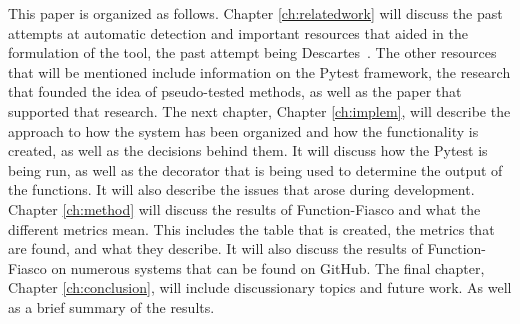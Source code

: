  This paper is organized as follows. Chapter \ref{ch:relatedwork} will discuss the past attempts at automatic detection and important resources that aided in the formulation of the tool, the past attempt being Descartes~\cite{vera2018descartes}. The other resources that will be mentioned include information on the Pytest framework, the research that founded the idea of pseudo-tested methods, as well as the paper that supported that research. The next chapter, Chapter \ref{ch:implem}, will describe the approach to how the system has been organized and how the functionality is created, as well as the decisions behind them. It will discuss how the Pytest is being run, as well as the decorator that is being used to determine the output of the functions. It will also describe the issues that arose during development. Chapter \ref{ch:method} will discuss the results of Function-Fiasco and what the different metrics mean. This includes the table that is created, the metrics that are found, and what they describe. It will also discuss the results of Function-Fiasco on numerous systems that can be found on GitHub. The final chapter, Chapter \ref{ch:conclusion}, will include discussionary topics and future work. As well as a brief summary of the results.
